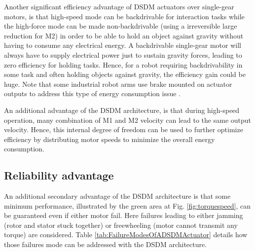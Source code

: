 Another significant efficiency advantage of DSDM actuators over single-gear motors, is that high-speed mode can be backdrivable for interaction tasks while the high-force mode can be made non-backdrivable (using a irreversible large reduction for M2) in order to be able to hold an object against gravity without having to consume any electrical energy. A backdrivable single-gear motor will always have to supply electrical power just to sustain gravity forces, leading to zero efficiency for holding tasks. Hence, for a robot requiring backdrivability in some task and often holding objects against gravity, the efficiency gain could be huge. Note that some industrial robot arms use brake mounted on actuator outputs to address this type of energy consumption issue \cite{meike_energy_2011}.

An additional advantage of the DSDM architecture, is that during high-speed operation, many combination of M1 and M2 velocity can lead to the same output velocity. Hence, this internal degree of freedom can be used to further optimize efficiency by distributing motor speeds to minimize the overall energy consumption. 


\subsection{Reliability advantage}
\label{sec:RelAdvantage}

An additional secondary advantage of the DSDM architecture is that some minimum performance, illustrated by the green area at Fig. \ref{fig:torquespeed}, can be guaranteed even if either motor fail. Here failures leading to either jamming (rotor and stator stuck together) or freewheeling (motor cannot transmit any torque) are considered. Table \ref{tab:FailureModesOfADSDMActuator} details how those failures mode can be addressed with the DSDM architecture.


